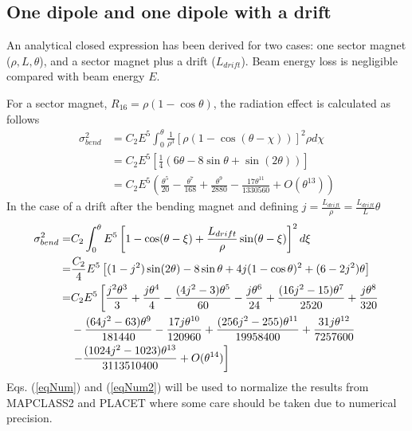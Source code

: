 \subsection{One dipole and one dipole with a drift}\label{s:closedexp}
An analytical closed expression has been derived for two cases: one sector magnet ($\rho,L,\theta$), and a sector magnet plus a drift ($L_{drift}$). Beam energy loss is negligible compared with beam energy $E$.\par
For a sector magnet, $R_{16}= \rho(1-\cos\theta)$, the radiation effect is calculated as follows
\begin{align}
\sigma_{bend}^2 &= C_2 E^5\int_0^\theta \frac{1}{\rho^3}[\rho(1-\cos(\theta-\chi))]^2\rho d\chi\\
&= C_2E^5\left[\frac{1}{4}(6\theta-8\sin\theta+\sin(2\theta))\right]\label{eqNum}\\
&=C_2E^5\left(\frac{\theta^5}{20}-\frac{\theta^7}{168}+\frac{\theta^9}{2880}-\frac{17\theta^{11}}{1330560}+O(\theta^{13})\right)
\end{align} 
 In the case of a drift after the bending magnet and defining $j=\frac{L_{drift}}{\rho}=\frac{L_{drift}}{L}\theta$
\begin{align}
  \sigma_{bend}^2 =& C_2 \int_0^\theta E^5\left[1-\cos(\theta-\xi)+\frac{L_{drift}}{\rho}\sin(\theta-\xi)\right]^2 d\xi\\
 =& \frac{C_2}{4} E^5 \left[(1-j^2)\sin(2\theta)-8\sin\theta+4j(1-\cos\theta)^2+(6-2j^2)\theta\right]\label{eqNum2}\\
  =& C_2 E^5 \left[\frac{j^2\theta^3}{3}+\frac{j\theta^4}{4}-\frac{(4j^2-3)\theta^5}{60}- \frac{j\theta^6}{24} +\frac{(16j^2-15)\theta^7}{2520}+\frac{j\theta^8}{320}\right.\notag\\
    &-\frac{(64j^2-63)\theta^9}{181440}-\frac{17j\theta^{10}}{120960}+\frac{(256j^2-255)\theta^{11}}{19958400}+\frac{31j\theta^{12}}{7257600}\notag\\
    &\left.-\frac{(1024j^2-1023)\theta^{13}}{3113510400}+O(\theta^{14})\right]
\end{align}
Eqs. (\ref{eqNum}) and (\ref{eqNum2}) will be used to normalize the results from MAPCLASS2 and PLACET \cite{Placet} where some care should be taken due to numerical precision.\par
